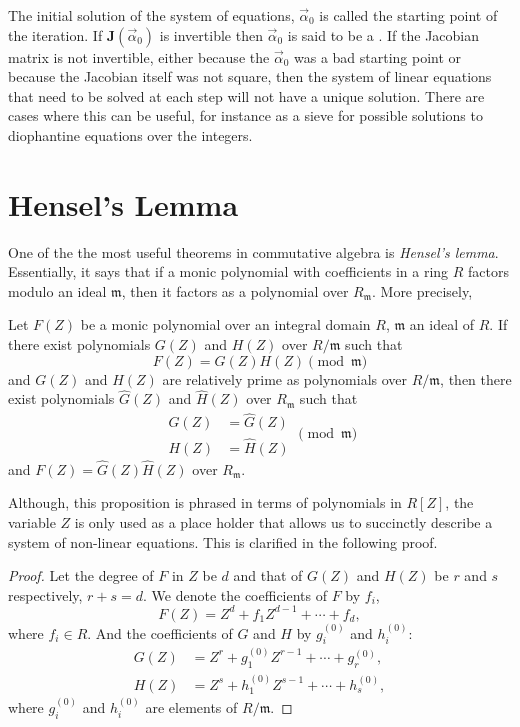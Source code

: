 {The initial solution of the system of equations, $\vec{\alpha}_{0}$ is
called the starting point of the iteration.  If
$\mathbf{J}(\vec{\alpha}_0)$ is invertible then $\vec{\alpha}_0$ is said
to be a .  If the Jacobian matrix is not
invertible, either because the $\vec{\alpha}_0$ was a bad starting
point or because the Jacobian itself was not square, then the system
of linear equations that need to be solved at each step will not have a
unique solution.  There are cases where this can be useful, for
instance as a sieve for possible solutions to diophantine 
equations
over the integers.

\section{Hensel's Lemma}
\label{Hensel:Lemma:Sec}

One of the the most useful theorems in commutative algebra is {\em
Hensel's lemma}.  Essentially, it says that if a monic polynomial with
coefficients in a ring $R$ factors modulo an ideal $\mathfrak{m}$, then
it factors as a polynomial over $R_\mathfrak{m}$.  More precisely,

\begin{proposition} \label{Hensel:Lemma:Prop}
Let $F(Z)$ be a monic polynomial over an integral domain $R$,
$\mathfrak{m}$ an ideal of $R$.  If there exist polynomials $G(Z)$ and
$H(Z)$ over $R/\mathfrak{m}$ such that 
\[
F(Z) = G(Z) H(Z) \pmod\mathfrak{m}
\]
and $G(Z)$ and $H(Z)$ are relatively prime as polynomials over
$R/\mathfrak{m}$, then there exist polynomials $\hat{G}(Z)$ and
$\hat{H}(Z)$ over $R_\mathfrak{m}$ such that
\[
\begin{aligned}
G(Z) & = \hat{G}(Z) \\ H(Z) & = \hat{H}(Z)
\end{aligned}
\pmod\mathfrak{m}
\]
and $F(Z) = \hat{G}(Z) \hat{H}(Z)$ over $R_\mathfrak{m}$.
\end{proposition}

Although, this proposition is phrased in terms of polynomials in $R[Z]$, 
the variable $Z$ is only used as a place holder that allows us to 
succinctly describe a system of non-linear equations.  This is clarified 
in the following proof. 

\begin{proof}
Let the degree of $F$ in $Z$ be $d$ and that of $G(Z)$ and $H(Z)$ be
$r$ and $s$ respectively, $r+s = d$.  We denote the coefficients of
$F$ by $f_i$,
\[
F(Z) = Z^d + f_1 Z^{d-1} + \cdots + f_d,
\]
where $f_i \in R$.  And the coefficients of $G$ and $H$ by $g^{(0)}_i$
and $h^{(0)}_i$:
\[
\begin{aligned}
G(Z) &= Z^r + g^{(0)}_1 Z^{r-1} + \cdots + g^{(0)}_r, \\
H(Z) &= Z^s + h^{(0)}_1 Z^{s-1} + \cdots + h^{(0)}_s,
\end{aligned}
\]
where $g^{(0)}_i$ and $h^{(0)}_i$ are elements of $R/\mathfrak{m}$.


\end{proof}}
